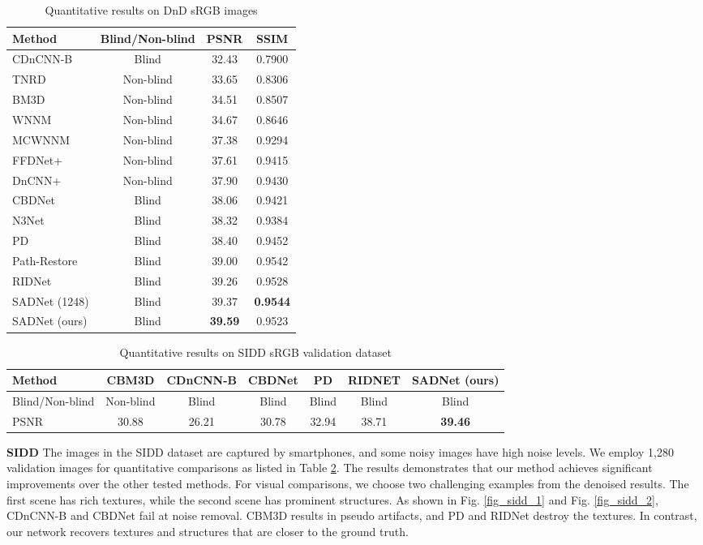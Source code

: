 \documentclass[runningheads]{llncs}
\begin{document}
\begin{table}
\setlength{\tabcolsep}{6pt}
\begin{center}
\caption{Quantitative results on DnD sRGB images}
\label{table_DND}
\begin{tabular}{lccc}
\hline
Method & Blind/Non-blind & PSNR & SSIM \\
\hline\hline
CDnCNN-B & Blind & 32.43 & 0.7900\\
TNRD & Non-blind & 33.65 & 0.8306\\
BM3D & Non-blind & 34.51 & 0.8507\\
WNNM & Non-blind & 34.67 & 0.8646\\
MCWNNM & Non-blind & 37.38 & 0.9294\\
FFDNet+ & Non-blind & 37.61 & 0.9415\\
DnCNN+ & Non-blind & 37.90 & 0.9430\\
CBDNet & Blind & 38.06 & 0.9421\\
N3Net & Blind & 38.32 & 0.9384\\
PD & Blind & 38.40 & 0.9452\\
Path-Restore & Blind & 39.00 & 0.9542\\
RIDNet & Blind & 39.26 & 0.9528\\
\hline
SADNet (1248) & Blind & 39.37 & \textbf{0.9544}\\
SADNet (ours) & Blind & \textbf{39.59} & 0.9523\\
\hline
\end{tabular}
\end{center}
\end{table}

\begin{table}
\setlength{\tabcolsep}{2pt}
\begin{center}
\caption{Quantitative results on SIDD sRGB validation dataset}
\label{table_SIDD}
\begin{tabular}{lcccccc}
\hline
Method & CBM3D & CDnCNN-B & CBDNet & PD & RIDNET & SADNet (ours)\\
\hline\hline
Blind/Non-blind & Non-blind & Blind & Blind & Blind & Blind & Blind \\
PSNR & 30.88 & 26.21 & 30.78 & 32.94 & 38.71 & \textbf{39.46}\\
\hline
\end{tabular}
\end{center}
\end{table}

\textbf{SIDD}
The images in the SIDD dataset are captured by smartphones, and some noisy images have high noise levels. We employ 1,280 validation images for quantitative comparisons as listed in Table \ref{table_SIDD}. The results demonstrates that our method achieves significant improvements over the other tested methods. For visual comparisons, we choose two challenging examples from the denoised results. The first scene has rich textures, while the second scene has prominent structures. As shown in Fig. \ref{fig_sidd_1} and Fig. \ref{fig_sidd_2}, CDnCNN-B and CBDNet fail at noise removal. CBM3D results in pseudo artifacts, and PD and RIDNet destroy the textures. In contrast, our network recovers textures and structures that are closer to the ground truth.
\end{document}
